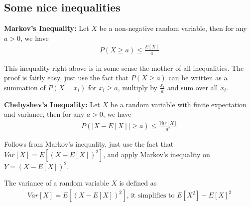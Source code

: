 \subsection{Some nice inequalities}
\begin{theorem}
    \textbf{Markov's Inequality:} Let $X$ be a non-negative random variable, then for any $a>0$, we have
    \begin{align}
        P(X \geq a) \leq \frac{E[X]}{a}
    \end{align}
\end{theorem}
This inequality right above is in some sense the mother of all inequalities. The proof is fairly easy, just use the fact that $P(X \geq a)$ can be written as a summation of $P(X = x_i)$ for $x_i \geq a$, multiply by $\frac{x_i}{a}$ and sum over all $x_i$.
\begin{theorem}
    \textbf{Chebyshev's Inequality:} Let $X$ be a random variable with finite expectation and variance, then for any $a>0$, we have
    \begin{align}
        P(|X-E[X]| \geq a) \leq \frac{Var[X]}{a^2}
    \end{align}
\end{theorem}
Follows from Markov's inequality, just use the fact that $Var[X]=E[(X-E[X])^2]$, and apply Markov's inequality on $Y=(X-E[X])^2$.
\begin{definition}
    The variance of a random variable $X$ is defined as
    \begin{align}
        Var[X]=E[(X-E[X])^2] \text{, it simplifies to } E[X^2]-E[X]^2
    \end{align}
\end{definition}
